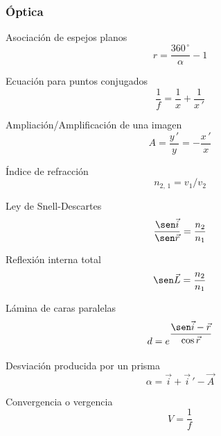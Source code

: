 \documentclass[11pt, twocolumn, landscape, a4paper]{article}
\begin{document}
\subsubsection*{Óptica}

Asociación de espejos planos
$$
r = \dfrac{360^{\,\circ}}{\alpha} - 1
$$

Ecuación para puntos conjugados
$$
\dfrac1{f} = \dfrac1{x} + \dfrac1{x\,'}
$$

Ampliación/Amplificación de una imagen
$$
A = \dfrac{y\,'}{y} = - \dfrac{x\,'}{x}
$$

Índice de refracción
$$
n_{2,\,1} = v_{1} / v_{2}
$$

Ley de Snell-Descartes
$$
\dfrac{\sen \vec{i}}{\sen \vec{r}} = \dfrac{n_{2}}{n_{1}}
$$

Reflexión interna total
$$
\sen \vec{L} = \dfrac{n_{2}}{n_1}
$$

Lámina de caras paralelas
$$
d = e^{\dfrac{\sen \vec{i} - \vec{r}}{\cos \vec{r}}}
$$

Desviación producida por un prisma
$$
\alpha = \vec{i} + \vec{i}\,' - \vec{A}
$$

Convergencia o vergencia
$$
V = \dfrac1{f}
$$
\end{document}
